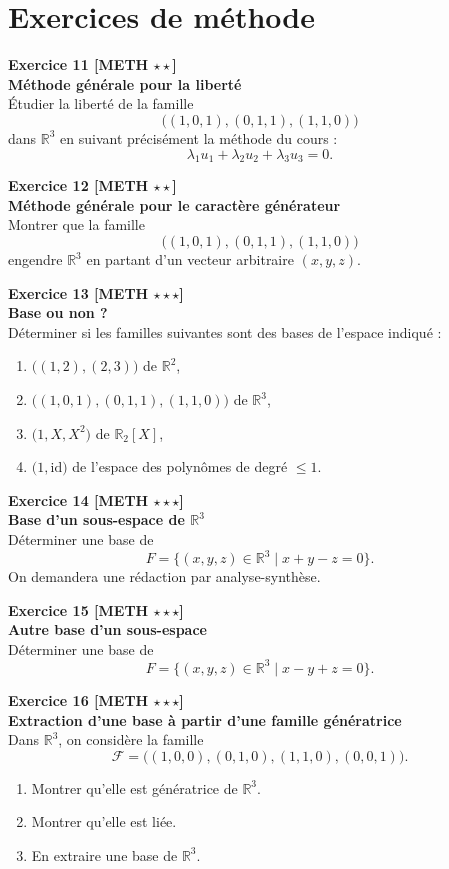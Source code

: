 \documentclass[11pt,a4paper]{article}
\begin{document}
\newpage

\section*{Exercices de méthode}

\textbf{Exercice 11 [METH $\star\star$]}\\
\textbf{Méthode générale pour la liberté}\\
Étudier la liberté de la famille
\[
\big((1,0,1),(0,1,1),(1,1,0)\big)
\]
dans \(\mathbb{R}^3\) en suivant précisément la méthode du cours :
\[
\lambda_1u_1+\lambda_2u_2+\lambda_3u_3=0.
\]

\textbf{Exercice 12 [METH $\star\star$]}\\
\textbf{Méthode générale pour le caractère générateur}\\
Montrer que la famille
\[
\big((1,0,1),(0,1,1),(1,1,0)\big)
\]
engendre \(\mathbb{R}^3\) en partant d’un vecteur arbitraire \((x,y,z)\).

\textbf{Exercice 13 [METH $\star\star\star$]}\\
\textbf{Base ou non ?}\\
Déterminer si les familles suivantes sont des bases de l’espace indiqué :
\begin{enumerate}[label=\alph*)]
    \item \(\big((1,2),(2,3)\big)\) de \(\mathbb{R}^2\),
    \item \(\big((1,0,1),(0,1,1),(1,1,0)\big)\) de \(\mathbb{R}^3\),
    \item \(\big(1,X,X^2\big)\) de \(\mathbb{R}_2[X]\),
    \item \(\big(1,\mathrm{id}\big)\) de l’espace des polynômes de degré \(\le 1\).
\end{enumerate}

\textbf{Exercice 14 [METH $\star\star\star$]}\\
\textbf{Base d’un sous-espace de \(\mathbb{R}^3\)}\\
Déterminer une base de
\[
F=\{(x,y,z)\in\mathbb{R}^3\mid x+y-z=0\}.
\]
On demandera une rédaction par analyse-synthèse.

\textbf{Exercice 15 [METH $\star\star\star$]}\\
\textbf{Autre base d’un sous-espace}\\
Déterminer une base de
\[
F=\{(x,y,z)\in\mathbb{R}^3\mid x-y+z=0\}.
\]

\textbf{Exercice 16 [METH $\star\star\star$]}\\
\textbf{Extraction d’une base à partir d’une famille génératrice}\\
Dans \(\mathbb{R}^3\), on considère la famille
\[
\mathcal F=\big((1,0,0),(0,1,0),(1,1,0),(0,0,1)\big).
\]
\begin{enumerate}[label=\alph*)]
    \item Montrer qu’elle est génératrice de \(\mathbb{R}^3\).
    \item Montrer qu’elle est liée.
    \item En extraire une base de \(\mathbb{R}^3\).
\end{enumerate}
\end{document}
